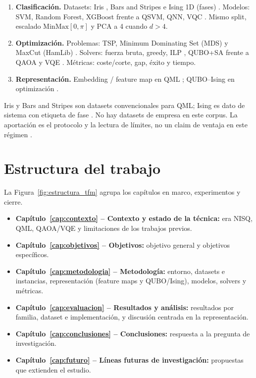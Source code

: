 \begin{enumerate}
    \item \textbf{Clasificación.} Datasets: Iris \citep{sklearnIris}, Bars and Stripes \citep{pennylaneBarsAndStripes, pennylaneConventionalDatasets} e Ising 1D (fases) \citep{pennylaneIsing, pennylaneWhatIsQuantumDataset}. Modelos: SVM, Random Forest, XGBoost frente a QSVM, QNN, VQC \citep{pennylaneVariationalClassifier}. Mismo split, escalado $\mathrm{MinMax}[0,\pi]$ y PCA a 4 cuando $d>4$.
    \item \textbf{Optimización.} Problemas: TSP, Minimum Dominating Set (MDS) y MaxCut (HamLib) \citep{sawaya2024hamlib, pennylaneHamlibMaxcut, pennylaneQaoaMaxcut}. Solvers: fuerza bruta, greedy, ILP \citep{gurobiIlp}, QUBO+SA frente a QAOA y VQE \citep{farhi2014, peruzzo2014, lubinski2024}. Métricas: coste/corte, gap, éxito y tiempo.
    \item \textbf{Representación.} Embedding / feature map en QML \citep{pennylaneGlossaryEmbedding, pennylaneEmbedBlog}; QUBO--Ising en optimización \citep{lucas2014}.
\end{enumerate}

Iris y Bars and Stripes son datasets convencionales para QML; Ising es dato de sistema con etiqueta de fase \citep{pennylaneWhatIsQuantumDataset, pennylaneConventionalDatasets}. No hay datasets de empresa en este corpus. La aportación es el protocolo y la lectura de límites, no un claim de ventaja en este régimen \citep{bowles2024}.

\section{Estructura del trabajo}

La Figura~\ref{fig:estructura_tfm} agrupa los capítulos en marco, experimentos y cierre.

\begin{itemize}
    \item \textbf{Capítulo~\ref{cap:contexto} -- Contexto y estado de la técnica:} era NISQ, QML, QAOA/VQE y limitaciones de los trabajos previos.
    \item \textbf{Capítulo~\ref{cap:objetivos} -- Objetivos:} objetivo general y objetivos específicos.
    \item \textbf{Capítulo~\ref{cap:metodologia} -- Metodología:} entorno, datasets e instancias, representación (feature maps y QUBO/Ising), modelos, solvers y métricas.
    \item \textbf{Capítulo~\ref{cap:evaluacion} -- Resultados y análisis:} resultados por familia, dataset e implementación, y discusión centrada en la representación.
    \item \textbf{Capítulo~\ref{cap:conclusiones} -- Conclusiones:} respuesta a la pregunta de investigación.
    \item \textbf{Capítulo~\ref{cap:futuro} -- Líneas futuras de investigación:} propuestas que extienden el estudio.
\end{itemize}

